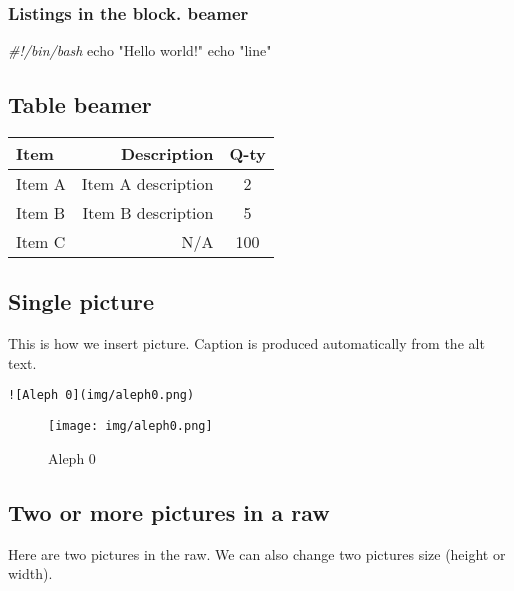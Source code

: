 \documentclass[
  11pt,
  ignorenonframetext,
]{article}
\newenvironment{Shaded}{}{}
\newcommand{\BuiltInTok}[1]{\textcolor[rgb]{0.00,0.50,0.00}{#1}}
\newcommand{\CommentTok}[1]{\textcolor[rgb]{0.38,0.63,0.69}{\textit{#1}}}
\newcommand{\StringTok}[1]{\textcolor[rgb]{0.25,0.44,0.63}{#1}}
\begin{document}
\subsubsection{Listings in the block.
beamer}\label{listings-in-the-block.-beamer}

\begin{Shaded}
\begin{Highlighting}[]
\CommentTok{\#!/bin/bash}
\BuiltInTok{echo} \StringTok{"Hello world!"}
\BuiltInTok{echo} \StringTok{"line"}
\end{Highlighting}
\end{Shaded}

\subsection{Table beamer}\label{table-beamer}

\begin{longtable}[]{@{}lrc@{}}
\toprule\noalign{}
\textbf{Item} & \textbf{Description} & \textbf{Q-ty} \\
\midrule\noalign{}
\endhead
\bottomrule\noalign{}
\endlastfoot
Item A & Item A description & 2 \\
Item B & Item B description & 5 \\
Item C & N/A & 100 \\
\end{longtable}

\subsection{Single picture}\label{single-picture}

This is how we insert picture. Caption is produced automatically from
the alt text.

\begin{verbatim}
![Aleph 0](img/aleph0.png) 
\end{verbatim}

\begin{figure}
\centering
\texttt{[image: img/aleph0.png]}
\caption{Aleph 0}
\end{figure}

\subsection{Two or more pictures in a
raw}\label{two-or-more-pictures-in-a-raw}

Here are two pictures in the raw. We can also change two pictures size
(height or width).
\end{document}
